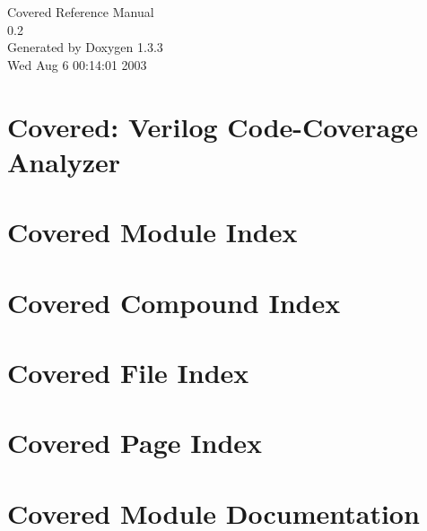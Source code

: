 \documentclass[a4paper]{book}
\begin{document}
\begin{titlepage}
\vspace*{7cm}
\begin{center}
{\Large Covered Reference Manual\\[1ex]\large 0.2 }\\
\vspace*{1cm}
{\large Generated by Doxygen 1.3.3}\\
\vspace*{0.5cm}
{\small Wed Aug 6 00:14:01 2003}\\
\end{center}
\end{titlepage}
\clearemptydoublepage
{}
\tableofcontents
\clearemptydoublepage
{}
\chapter{Covered: Verilog Code-Coverage Analyzer }
\label{index}
\chapter{Covered Module Index}

\chapter{Covered Compound Index}

\chapter{Covered File Index}

\chapter{Covered Page Index}

\chapter{Covered Module Documentation}












\end{document}
